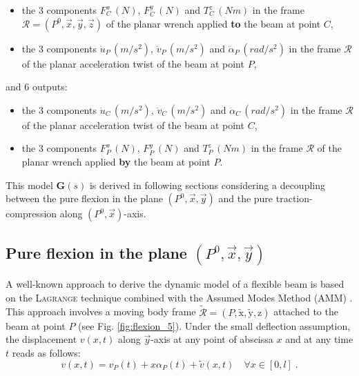 \documentclass[smallcondensed]{svjour3}     %
\begin{document}
\begin{itemize}
\item the 3 components $F^x_{C}\,(N)$, $F^y_{C}\,(N)$ and $T^z_{C}\,(Nm)$ in the frame $\mathcal{R}=(P^0,\vec{x},\vec{y},\vec{z})$ of the planar wrench applied \textbf{to} the beam at point $C$,
\item the 3 components $\ddot{u}_{P}\,(m/s^2)$, $\ddot{v}_{P}\,(m/s^2)$ and $\ddot{\alpha}_{P}\,(rad/s^2)$ in the frame $\mathcal{R}$ of the planar acceleration twist of the beam at point $P$,
\end{itemize}
and 6 outputs:
\begin{itemize}
\item the 3 components $\ddot{u}_{C}\,(m/s^2)$, $\ddot{v}_{C}\,(m/s^2)$ and $\ddot{\alpha}_{C}\,(rad/s^2)$ in the frame $\mathcal{R}$ of the planar acceleration twist of the beam at point $C$,
\item the 3 components $F^x_{P}\,(N)$, $F^y_{P}\,(N)$ and $T^z_{P}\,(Nm)$ in the frame $\mathcal{R}$ of the planar wrench applied \textbf{by} the beam at point $P$.
\end{itemize}
This model $\mathbf{G}(s)$ is derived in following sections considering a decoupling between the pure flexion in the plane $(P^0,\vec{x},\vec{y})$ and the pure traction-compression along $(P^0,\vec{x})$-axis.

\subsection{Pure flexion in the plane $(P^0,\vec{x},\vec{y})$}
A well-known approach to derive the dynamic model of a flexible beam is based on the \textsc{Lagrange} technique combined with the Assumed Modes Method (AMM) \cite{DeLucaSiciliano}. This approach involves a moving body frame $\widetilde{\mathcal{R}}=(P,\widetilde{\mathrm{x}},\widetilde{\mathrm{y}},\mathrm{z})$ attached to the beam at point $P$ (see Fig. \ref{fig:flexion_5}). Under the small deflection assumption, the displacement $v(x,t)$ along $\vec{y}$-axis at any point of abscissa $x$ and at any time $t$ reads as follows:
\begin{equation}\label{eq:defv}
v(x,t)=v_P(t)+x\alpha_P(t)+\widetilde{v}(x,t)\quad \forall x\in [0,l]\;.
\end{equation}
\end{document}
